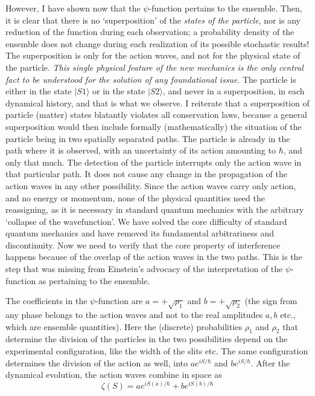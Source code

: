 However, I have shown now that the $\psi$-function pertains to the ensemble. Then, it is
clear that there is no `superposition' of the \textit{states of the particle}, nor is any reduction of
the function during each observation; a probability density of the ensemble does not change
during each realization of its possible stochastic results! The superposition is only for the
action waves, and not for the physical state of the particle. \textit{This single physical feature
of the new mechanics is the only central fact to be understood for the solution of any
foundational issue}. The particle is either in the state $|S1 \rangle$ or in the state $|S2\rangle$, and never
in a superposition, in each dynamical history, and that is what we observe. I reiterate that
a superposition of particle (matter) states blatantly violates all conservation laws, because
a general superposition would then include formally (mathematically) the situation of the
particle being in two spatially separated paths. The particle is already in the path where
it is observed, with an uncertainty of its action amounting to $\hbar$, and only that much. The
detection of the particle interrupts only the action wave in that particular path. It does not
cause any change in the propagation of the action waves in any other possibility. Since the
action waves carry only action, and no energy or momentum, none of the physical quantities
need the reassigning, as it is necessary in standard quantum mechanics with the arbitrary 
`collapse of the wavefunction'. We have solved the core difficulty of standard quantum
mechanics and have removed its fundamental arbitrariness and discontinuity. Now we need
to verify that the core property of interference happens because of the overlap of the action
waves in the two paths. This is the step that was missing from Einstein's advocacy of the
interpretation of the $\psi$-function as pertaining to the ensemble.

The coefficients in the $\psi$-function are $a = + \sqrt{\rho_1}$ and $b = + \sqrt{\rho_2}$ (the sign from any phase
belongs to the action waves and not to the real amplitudes $a,b$ etc., which are ensemble quantities).
Here the (discrete) probabilities $\rho_1$ and $\rho_2$ that determine the division of the particles in the
two possibilities depend on the experimental configuration, like the width of the slits etc.
The same configuration determines the division of the action as well, into $ae^{iS/\hbar}$ and $be^{iS/\hbar}$.
After the dynamical evolution, the action waves combine in space as
\begin{equation*}
\zeta(S) = ae^{iS(a)/\hbar} + be^{iS (b)/\hbar} \tag{28}\label{c14-eq28}
\end{equation*}


